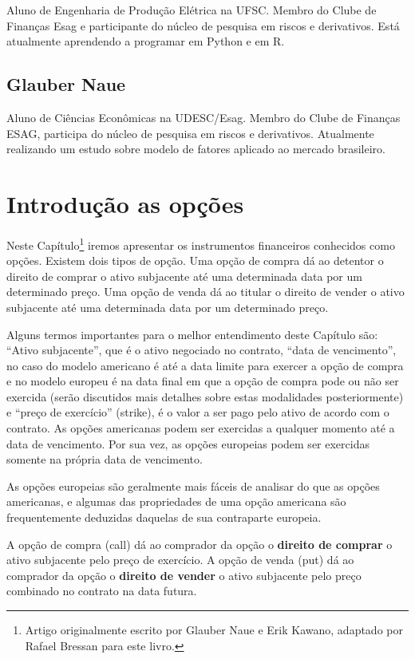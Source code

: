 \documentclass[]{book}
\let\rmarkdownfootnote\footnote%
\def\footnote{\protect\rmarkdownfootnote}
\theoremstyle{definition}
\theoremstyle{definition}
\theoremstyle{definition}
\theoremstyle{remark}
\begin{document}
Aluno de Engenharia de Produção Elétrica na UFSC. Membro do Clube de
Finanças Esag e participante do núcleo de pesquisa em riscos e
derivativos. Está atualmente aprendendo a programar em Python e em R.

\section*{Glauber Naue}\label{glauber-naue}

Aluno de Ciências Econômicas na UDESC/Esag. Membro do Clube de Finanças
ESAG, participa do núcleo de pesquisa em riscos e derivativos.
Atualmente realizando um estudo sobre modelo de fatores aplicado ao
mercado brasileiro.

\chapter{Introdução as opções}\label{opcoes}

Neste Capítulo\footnote{Artigo originalmente escrito por Glauber Naue e
  Erik Kawano, adaptado por Rafael Bressan para este livro.} iremos
apresentar os instrumentos financeiros conhecidos como opções. Existem
dois tipos de opção. Uma opção de compra dá ao detentor o direito de
comprar o ativo subjacente até uma determinada data por um determinado
preço. Uma opção de venda dá ao titular o direito de vender o ativo
subjacente até uma determinada data por um determinado preço.

Alguns termos importantes para o melhor entendimento deste Capítulo são:
``Ativo subjacente'', que é o ativo negociado no contrato, ``data de
vencimento'', no caso do modelo americano é até a data limite para
exercer a opção de compra e no modelo europeu é na data final em que a
opção de compra pode ou não ser exercida (serão discutidos mais detalhes
sobre estas modalidades posteriormente) e ``preço de exercício''
(strike), é o valor a ser pago pelo ativo de acordo com o contrato. As
opções americanas podem ser exercidas a qualquer momento até a data de
vencimento. Por sua vez, as opções europeias podem ser exercidas somente
na própria data de vencimento.

As opções europeias são geralmente mais fáceis de analisar do que as
opções americanas, e algumas das propriedades de uma opção americana são
frequentemente deduzidas daquelas de sua contraparte europeia.

A opção de compra (call) dá ao comprador da opção o \textbf{direito de
comprar} o ativo subjacente pelo preço de exercício. A opção de venda
(put) dá ao comprador da opção o \textbf{direito de vender} o ativo
subjacente pelo preço combinado no contrato na data futura.
\end{document}
